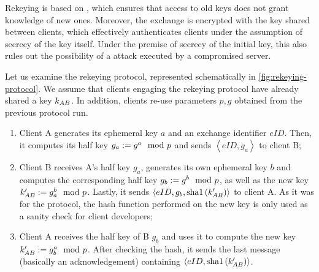 Rekeying is based on \DiHe{}, which ensures that access to old keys does not grant knowledge of new ones. Moreover, the exchange is encrypted with the \schat{} key shared between clients, which effectively authenticates clients under the assumption of secrecy of the key itself. Under the premise of secrecy of the initial \schat{} key, this also rules out the possibility of a \mitm{} attack executed by a compromised server.

Let us examine the rekeying protocol, represented schematically in \cref{fig:rekeying-protocol}. We assume that clients engaging the rekeying protocol have already shared a \schat{} key $k_{AB}$. In addition, clients re-use \DiHe{} parameters $p, g$ obtained from the previous \schat{} protocol run.

\begin{enumerate}
  \item{Client A generates its \DiHe{} ephemeral key $a$ and an exchange identifier $eID$. Then, it computes its half key $g_a:= g^a \mod{p}$ and sends $\left<eID, g_a\right>$ to client B;}
  \item{Client B receives A's half key $g_a$, generates its own ephemeral key $b$ and computes the corresponding half key $g_b:= g^b \mod{p}$, as well as the new key $k'_{AB}:= g_a^b \mod{p}$. Lastly, it sends $\left<eID, g_b, \mbox{sha1}\left(k'_{AB}\right)\right>$ to client A. As it was for the \schat{} protocol, the hash function performed on the new key is only used as a sanity check for client developers;}
  \item{Client A receives the half key of B $g_b$ and uses it to compute the new key $k'_{AB}:= g_b^a \mod{p}$. After checking the hash, it sends the last message (basically an acknowledgement) containing $\left<eID, \mbox{sha1}\left(k'_{AB}\right)\right>$.}
\end{enumerate}